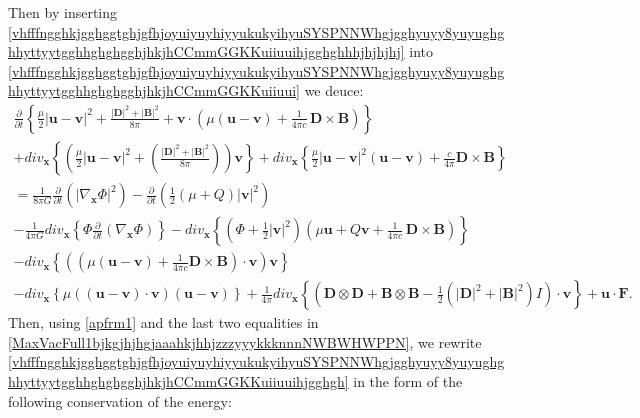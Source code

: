 \documentclass{article}
\theoremstyle{definition}
\theoremstyle{remark}
\renewcommand{\vec}[1]{\mathbf{#1}}
\newcommand{\er}{\eqref}
\newcommand{\er}{\eqref}
\begin{document}
Then by inserting
\er{vhfffngghkjgghggtghjgfhjoyuiyuyhiyyukukyihyuSYSPNNWhgjgghyuyy8yuyughghhyttyytgghhghghgghjhkjhCCmmGGKKuiiuuihjgghghhhjhjhjhj}
into
\er{vhfffngghkjgghggtghjgfhjoyuiyuyhiyyukukyihyuSYSPNNWhgjgghyuyy8yuyughghhyttyytgghhghghgghjhkjhCCmmGGKKuiiuui}
we deuce:
\begin{multline}\label{vhfffngghkjgghggtghjgfhjoyuiyuyhiyyukukyihyuSYSPNNWhgjgghyuyy8yuyughghhyttyytgghhghghgghjhkjhCCmmGGKKuiiuuihjgghgh}
\frac{\partial}{\partial t}\left\{ \frac{\mu}{2}\left|\vec u-\vec
v\right|^2+\frac{|\vec D|^2+|\vec B|^2}{8\pi}+\vec v\cdot\left( \mu
 \left(\vec
u-\vec v\right) +\frac{1}{4\pi c}\,\vec D\times \vec
B\right)\right\}\\+div_{\vec x}\left\{\left(\frac{\mu}{2}\left|\vec
u-\vec v\right|^2+\left(\frac{|\vec D|^2+|\vec
B|^2}{8\pi}\right)\right)\vec v\right\}+div_{\vec
x}\left\{\frac{\mu}{2}\left|\vec u-\vec v\right|^2(\vec u-\vec
v)+\frac{c}{4\pi}\vec D\times \vec B\right\}\\= \frac{1}{8\pi G}
\frac{\partial}{\partial t}\left(\left|\nabla_{\vec
x}\Phi\right|^2\right) - \frac{\partial}{\partial
t}\left(\frac{1}{2}\left(\mu+Q\right)\left|\vec
v\right|^2\right)\\-\frac{1}{4\pi G}div_{\vec x}\left\{\Phi
\frac{\partial}{\partial t}\left(\nabla_{\vec
x}\Phi\right)\right\}-div_{\vec
x}\left\{\left(\Phi+\frac{1}{2}\left|\vec v\right|^2\right)\left(
\mu \vec u+Q\vec v+\frac{1}{4\pi c}\,\vec D\times \vec
B\right)\right\}\\- div_{\vec x}\left\{\left(\left(\mu\left(\vec
u-\vec v\right)+\frac{1}{4\pi c}\vec D\times \vec B\right)\cdot\vec
v\right)\vec v\right\}\\-div_{\vec x}\left\{\mu \left(\left(\vec
u-\vec v\right)\cdot\vec v\right) \left(\vec u-\vec
v\right)\right\}+\frac{1}{4\pi}div_{\vec x}\left\{\left(\vec
D\otimes \vec D+\vec B\otimes \vec B-\frac{1}{2}\left(|\vec
D|^2+|\vec B|^2\right)I\right)\cdot\vec v
\right\}
+\vec u\cdot\vec F.
\end{multline}
Then, using \er{apfrm1} and the last two equalities in
\er{MaxVacFull1bjkgjhjhgjaaahkjhhjzzzyyykkknnnNWBWHWPPN},  we
rewrite
\er{vhfffngghkjgghggtghjgfhjoyuiyuyhiyyukukyihyuSYSPNNWhgjgghyuyy8yuyughghhyttyytgghhghghgghjhkjhCCmmGGKKuiiuuihjgghgh}
in the form of the following conservation of the energy:
\end{document}

